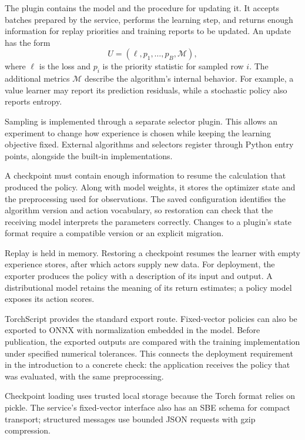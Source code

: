 \documentclass{strategynet-journal}
\begin{document}
\begin{SNcolumns}

The plugin contains the model and the procedure for updating it. It accepts
batches prepared by the service, performs the learning step, and returns enough
information for replay priorities and training reports to be updated. An update
has the form
\[
  U=(\ell,p_1,\ldots,p_B,\mathcal M),
\]
where $\ell$ is the loss and $p_i$ is the priority statistic for sampled row
$i$. The additional metrics $\mathcal M$ describe the algorithm's internal
behavior. For example, a value learner may report its prediction residuals,
while a stochastic policy also reports entropy.

Sampling is implemented through a separate selector plugin. This allows an
experiment to change how experience is chosen while keeping the learning
objective fixed. External algorithms and selectors register through Python
entry points, alongside the built-in implementations.

A checkpoint must contain enough information to resume the calculation that
produced the policy. Along with model weights, it stores the optimizer state
and the preprocessing used for observations. The saved configuration identifies
the algorithm version and action vocabulary, so restoration can check that
the receiving model interprets the parameters correctly. Changes to a plugin's
state format require a compatible version or an explicit migration.

Replay is held in memory. Restoring a checkpoint resumes the learner with
empty experience stores, after which actors supply new data. For deployment,
the exporter produces the policy with a description of its input and output.
A distributional model retains the meaning of its return estimates; a
policy model exposes its action scores.

TorchScript provides the standard export route. Fixed-vector policies can
also be exported to ONNX with normalization embedded in the model. Before
publication, the exported outputs are compared with the training implementation
under specified numerical tolerances. This connects the deployment requirement
in the introduction to a concrete check: the application receives the policy
that was evaluated, with the same preprocessing.

Checkpoint loading uses trusted local storage because the Torch format relies
on pickle. The service's fixed-vector interface also has an SBE schema for
compact transport; structured messages use bounded JSON requests with gzip
compression.

\end{SNcolumns}
\end{document}

